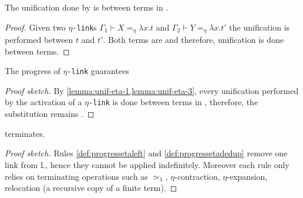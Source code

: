 \documentclass[sigconf,natbib=false,review]{acmart}
\newcommand{\UnifRel}{\ensuremath{\simeq}}
\newcommand{\Ue}{\ensuremath{\UnifRel_\lambda}\xspace}
\newcommand{\linkMacro}[1]{\ensuremath{#1}\texttt{-link}\xspace}
\newcommand{\linketa} {\linkMacro{\eta}}
\newcommand{\linketaM}[3]{\ensuremath{#1 \vdash #2 =_\eta #3}}
\newcommand{\linkStore}{\texorpdfstring{\ensuremath{\mathbb{L}}\xspace}{L}}
\begin{document}
\begin{lemma}
  The unification done by \progressetadedup is between
  terms in \wellb.
  \label{lemma:unif-eta-3}
\end{lemma}

\begin{proof}
  Given two \linketa{}s \linketaM{\Gamma_1}{X}{\lambda x.t} and
  \linketaM{\Gamma_2}{Y}{\lambda x.t'} 
  the unification is performed between $t$ and $t'$. Both terms are
  \wellb and therefore, unification is done between \wellb terms.
\end{proof}

\begin{lemma}
  The progress of \linketa guarantees 
  \label{lemma:unif-wellb}
\end{lemma}

\begin{proof}[Proof sketch]
  By \cref{lemma:unif-eta-1,lemma:unif-eta-3}, every
  unification performed by the activation of a \linketa is done between
  terms in \wellb, therefore, the substitution remains \wellb.
\end{proof}

\begin{lemma}
   terminates.
  \label{lemma:prog-eta-terminates}
\end{lemma}

\begin{proof}[Proof sketch]
  Rules \cref{def:progressetaleft} and
  \cref{def:progressetadedup} remove one link from \linkStore, hence they
  cannot be applied indefinitely.
  Moreover each rule only relies on terminating operations such as \Ue,
  $\eta$-contraction, $\eta$-expansion, relocation (a recursive copy of a
  finite term).
\end{proof}  
\end{document}
